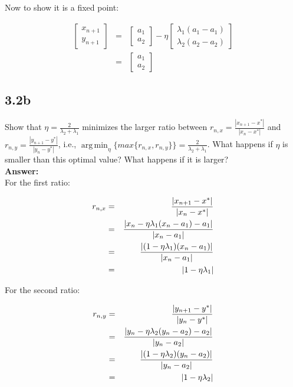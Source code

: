 \documentclass[a4paper]{article}
\DeclareMathOperator*{\argmin}{arg\,min}
\begin{document}
Now to show it is a fixed point:

\begin{eqnarray}
\begin{bmatrix}
x_{n+1}\\
y_{n+1}
\end{bmatrix} &=& \begin{bmatrix}
a_1\\
a_2
\end{bmatrix} - \eta \begin{bmatrix}
\lambda_1 (a_1-a_1)\\
\lambda_2 (a_2-a_2)
\end{bmatrix}\\
&=& \begin{bmatrix}
a_1\\
a_2
\end{bmatrix}
\end{eqnarray}


\subsection*{3.2b}

Show that $\eta = \frac{2}{\lambda_2 + \lambda_1}$ minimizes the larger ratio between $r_{n,x} = \frac{|x_{n+1} - x^*|}{|x_n - x^*|}$ and 	$r_{n,y} = \frac{|y_{n+1} - y^*|}{|y_n - y^*|}$, i.e., $\argmin_\eta \{ max\{r_{n,x},r_{n,y} \} \} = \frac{2}{\lambda_2 + \lambda_1}$. What happens if $\eta$ is smaller than this optimal value? What happens if it is larger?\\

\textbf{Answer:}\\


For the first ratio:

\begin{eqnarray}
r_{n,x} &=& \frac{\abs{x_{n+1}- x^*}}{\abs{x_n - x^*}}\\
&=& \frac{\abs{x_n - \eta\lambda_1 (x_n-a_1) - a_1}}{\abs{x_n - a_1}}\\
&=& \frac{\abs{ (1- \eta \lambda_1) (x_n - a_1)}}{\abs{x_n - a_1}}\\
&=& \abs{1-\eta \lambda_1}
\end{eqnarray}

For the second ratio:

\begin{eqnarray}
r_{n,y} &=& \frac{\abs{y_{n+1}- y^*}}{\abs{y_n - y^*}}\\
&=& \frac{\abs{y_n - \eta\lambda_2 (y_n-a_2) - a_2}}{\abs{y_n - a_2}}\\
&=& \frac{\abs{ (1- \eta \lambda_2) (y_n - a_2)}}{\abs{y_n - a_2}}\\
&=& \abs{1-\eta \lambda_2}
\end{eqnarray}
\end{document}
